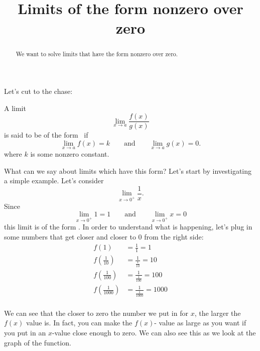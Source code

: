 \documentclass{ximera}
\title[Dig-In:]{Limits of the form nonzero over zero}
\begin{document}
\begin{abstract}
  We want to solve limits that have the form nonzero over zero.
\end{abstract}

\maketitle


Let's cut to the chase:
\begin{definition}
  A limit
  \[
  \lim_{x\to a} \frac{f(x)}{g(x)}
  \]
  is said to be of the form \numOverZero\ if
  \[
  \lim_{x\to a} f(x) = k\qquad\text{and}\qquad \lim_{x\to a} g(x) =0.
  \]
  where $k$ is some nonzero constant.
\end{definition}

What can we say about limits which have this form?
Let's start by investigating a simple example.  Let's consider
\[
\lim_{x\to 0^+} \frac{1}{x}.
\]
Since
\[
\lim_{x\to 0^+} 1 = 1\qquad\text{and}\qquad\lim_{x\to0^+} x = 0 
\]
this limit is of the form \numOverZero.  In order to understand what
is happening, let's plug in some numbers that get closer and closer to
$0$ from the right side:
\begin{align*}
f(1) &= \frac{1}{1}=1\\
f\left(\frac{1}{10}\right) &= \frac{1}{\frac{1}{10}}=10\\
f\left(\frac{1}{100}\right) &= \frac{1}{\frac{1}{100}}=100\\
f\left(\frac{1}{1000}\right) &= \frac{1}{\frac{1}{1000}}=1000\\ 
\end{align*}


We can see that the closer to zero the number we put in for $x$, the larger the $f(x)$ value is.  In fact, you can make the $f(x)$- value as large as you want if you put in an $x$-value close enough to zero.  We can also see this as we look at the graph of the function.

\end{document}
